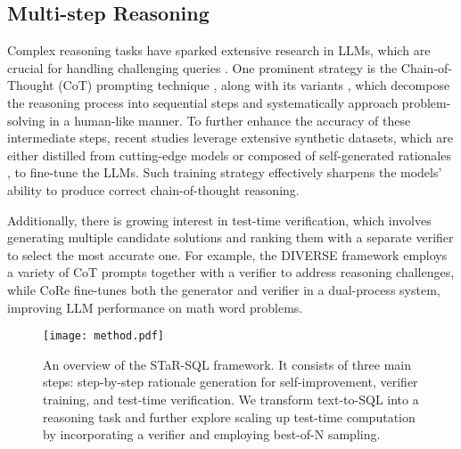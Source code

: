 \subsection{Multi-step Reasoning}
Complex reasoning tasks have sparked extensive research in LLMs, which are crucial for handling challenging queries \citep{kaddour2023challenges,lightman2023let, huang2023large}. One prominent strategy is the Chain-of-Thought (CoT) prompting technique \citep{wei2022chain}, along with its variants \citep{kojima2022large, wang2022self, yao2024tree}, which decompose the reasoning process into sequential steps and systematically approach problem-solving in a human-like manner. To further enhance the accuracy of these intermediate steps, recent studies leverage extensive synthetic datasets, which are either distilled from cutting-edge models \citep{yu2023metamath, luo2023wizardmath} or composed of self-generated rationales \citep{zelikman2022star, yuan2023scaling, ni2022learning}, to fine-tune the LLMs. Such training strategy effectively sharpens the models' ability to produce correct chain-of-thought reasoning.

Additionally, there is growing interest in test-time verification, which involves generating multiple candidate solutions and ranking them with a separate verifier \citep{cobbe2021training, he2024advancing} to select the most accurate one. For example, the DIVERSE framework \citep{Li2022MakingLM} employs a variety of CoT prompts together with a verifier to address reasoning challenges, while CoRe \citep{zhu2022solving} fine-tunes both the generator and verifier in a dual-process system, improving LLM performance on math word problems.

\begin{figure*}[ht]
 \centering
 \texttt{[image: method.pdf]}
 \caption{An overview of the STaR-SQL framework. It consists of three main steps: step-by-step rationale generation for self-improvement, verifier training, and test-time verification. We transform text-to-SQL into a reasoning task and further explore scaling up test-time computation by incorporating a verifier and employing best-of-N sampling.}
\end{figure*}